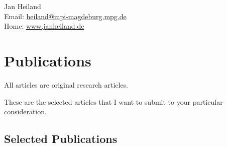 \documentclass[11pt, a4paper]{article} %
\begin{document}
\sffamily

{\LARGE Jan Heiland}\\[1cm] %
Email: \href{mailto:heiland@mpi-magdeburg.mpg.de}{heiland@mpi-magdeburg.mpg.de}\\ %
Home: \href{http://www.janheiland.de}{www.janheiland.de}\\[.3in] %



\section*{Publications}

All articles are original research articles.


\vspace{.1in}
% 

These are the selected articles that I want to submit to your particular consideration.

\subsection*{Selected Publications}


\vspace{.1in}
% 
\end{document}
